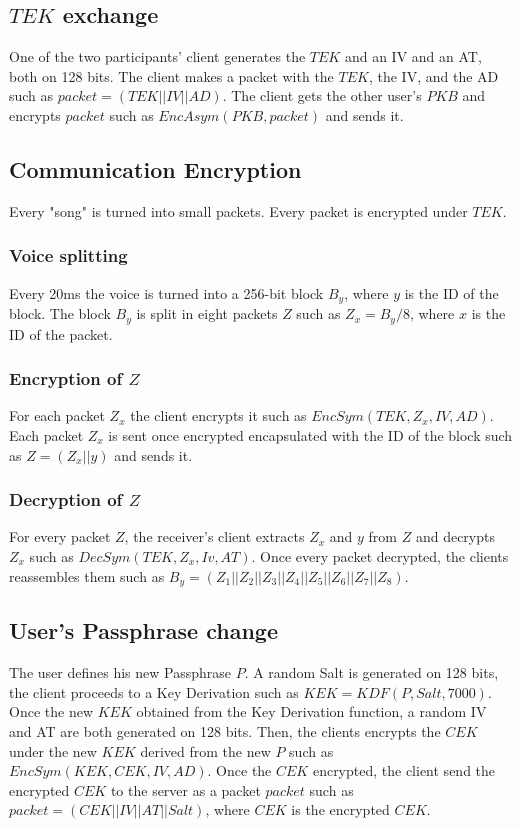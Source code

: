 \documentclass[a4paper,10pt]{article}
\begin{document}
\subsection{$TEK$ exchange}
One of the two participants' client generates the $TEK$ and an IV and an AT, both on 128 bits. The client makes a packet with the $TEK$, the IV, and the AD such as $packet=(TEK||IV||AD)$. The client gets the other user's $PKB$ and encrypts $packet$ such as $EncAsym(PKB,packet)$ and sends it.

\subsection{Communication Encryption}
Every "song" is turned into small packets. Every packet is encrypted under $TEK$.

\subsubsection{Voice splitting}
Every 20ms the voice is turned into a 256-bit block $B_y$, where $y$ is the ID of the block. The block $B_y$ is split in eight packets $Z$ such as $Z_x=B_y/8$, where $x$ is the ID of the packet. 

\subsubsection{Encryption of $Z$}
For each packet $Z_x$ the client encrypts it such as $EncSym(TEK,Z_x,IV,AD)$. Each packet $Z_x$ is sent once encrypted encapsulated with the ID of the block such as $Z=(Z_x||y)$ and sends it.

\subsubsection{Decryption of $Z$}
For every packet $Z$, the receiver's client extracts $Z_x$ and $y$ from $Z$ and decrypts $Z_x$ such as $DecSym(TEK,Z_x,Iv,AT)$. Once every packet decrypted, the clients reassembles them such as $B_y=(Z_1||Z_2||Z_3||Z_4||Z_5||Z_6||Z_7||Z_8)$.

\subsection{User's Passphrase change}
The user defines his new Passphrase $P$. A random Salt is generated on 128 bits, the client proceeds to a Key Derivation such as $KEK=KDF(P, Salt, 7000)$. Once the new $KEK$ obtained from the Key Derivation function, a random IV and AT are both generated on 128 bits. Then, the clients encrypts the $CEK$ under the new $KEK$ derived from the new $P$ such as $EncSym(KEK,CEK,IV,AD)$. Once the $CEK$ encrypted, the client send the encrypted $CEK$ to the server as a packet $packet$ such as $packet=(CEK||IV||AT||Salt)$, where $CEK$ is the encrypted $CEK$.
 
\end{document}
